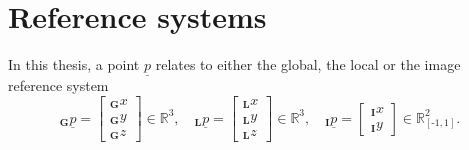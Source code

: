 \section{Reference systems}
In this thesis,
a point 
$
    \underline p
$
relates to either the global,
the local
or the image 
reference system
\begin{equation}
    {}_\textbf{G}\underline p 
    = 
    \begin{bmatrix}
        {}_\textbf{G}x \\ {}_\textbf{G}y \\ {}_\textbf{G}z
    \end{bmatrix}
    \in \mathbb{R}^3
    ,\quad
    {}_\textbf{L}\underline p
    = 
    \begin{bmatrix}
        {}_\textbf{L}x \\ {}_\textbf{L}y \\ {}_\textbf{L}z
    \end{bmatrix}
    \in \mathbb{R}^3
    ,\quad 
    {}_\textbf{I}\underline p
    = 
    \begin{bmatrix}
        {}_\textbf{I}x \\ {}_\textbf{I}y
    \end{bmatrix}
    \in \mathbb{R}_{[\text{-}1,1]}^2.
\end{equation}


